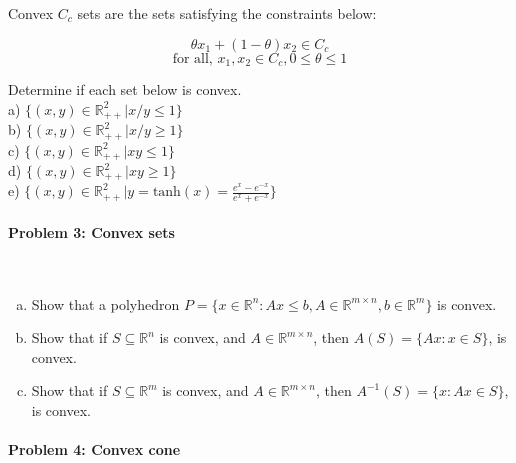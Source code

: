 \documentclass[a4paper]{article}
\newenvironment{solution}
{\color{blue} \paragraph{Solution.}}
{\newline \qed}
\begin{document}
\noindent
Convex $C_c$ sets are the sets satisfying the constraints below:

$$\theta x_1 + (1-\theta)x_2 \in C_c$$
$$\text{for all, } x_1,x_2\in C_c, 0\leq \theta \leq 1$$

\noindent
Determine if each set below is convex.\\

\noindent
a) $\{(x,y)\in \mathbb{R}^2_{++}|x/y\leq 1\}$\\

\noindent
b) $\{(x,y)\in \mathbb{R}^2_{++}|x/y\geq 1\}$\\

\noindent
c) $\{(x,y)\in \mathbb{R}^2_{++}|xy\leq 1\}$\\

\noindent
d) $\{(x,y)\in \mathbb{R}^2_{++}|xy\geq 1\}$\\

\noindent
e) $\{(x,y)\in \mathbb{R}^2_{++}|y= \text{tanh}(x)=\frac{e^x-e^{-x}}{e^x+e^{-x}}\}$\\



\paragraph{Problem 3: Convex sets}
~\\

\begin{enumerate}[a)]
	\item Show that a polyhedron $P=\{x\in \mathbb{R}^n: Ax \leq b, A\in \mathbb{R}^{m\times n}, b\in\mathbb{R}^m\}$ is convex.
	
	\item Show that if $S\subseteq  \mathbb{R}^n$ is convex, and $A \in \mathbb{R}^{m \times n}$,
	then $A(S) = \{ Ax : x \in S \}$, is convex.
	
	\item Show that if $S\subseteq  \mathbb{R}^m$ is convex, and $A \in \mathbb{R}^{m \times n}$,
	then $A^{-1}(S) = \{ x : Ax \in S \}$, is convex.
\end{enumerate}



\paragraph{Problem 4: Convex cone}
~\\
\end{document}
